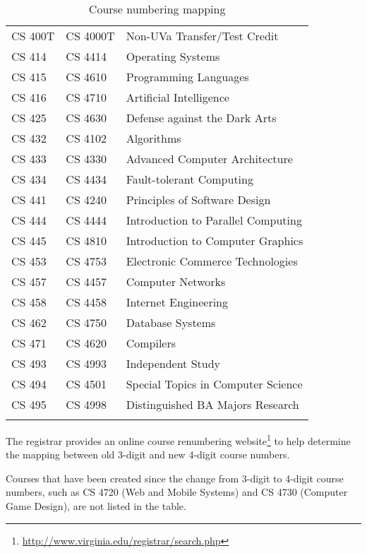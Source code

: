\documentclass[10pt,letter]{book}
\newcommand{\myurl}[1]{\footnote{\scriptsize\url{#1}}}
\begin{document}
\begin{table}
\begin{tabular}{llp{2.5in}}
CS 400T & CS 4000T & Non-UVa Transfer/Test Credit \\
CS 414 & CS 4414 & Operating Systems \\
CS 415 & CS 4610 & Programming Languages \\
CS 416 & CS 4710 & Artificial Intelligence \\
CS 425 & CS 4630 & Defense against the Dark Arts \\
CS 432 & CS 4102 & Algorithms \\
CS 433 & CS 4330 & Advanced Computer Architecture \\
CS 434 & CS 4434 & Fault-tolerant Computing \\
CS 441 & CS 4240 & Principles of Software Design \\
CS 444 & CS 4444 & Introduction to Parallel Computing \\
CS 445 & CS 4810 & Introduction to Computer Graphics \\
CS 453 & CS 4753 & Electronic Commerce Technologies \\
CS 457 & CS 4457 & Computer Networks \\
CS 458 & CS 4458 & Internet Engineering \\
CS 462 & CS 4750 & Database Systems \\
CS 471 & CS 4620 & Compilers \\
CS 493 & CS 4993 & Independent Study \\
CS 494 & CS 4501 & Special Topics in Computer Science \\
CS 495 & CS 4998 & Distinguished BA Majors Research \\ \hline
\\
\end{tabular}
\caption{Course numbering mapping}
\end{table}

The registrar provides an online course renumbering
website\myurl{http://www.virginia.edu/registrar/search.php}
to help determine the mapping between old 3-digit and new 4-digit
course numbers.

Courses that have been created since the change from 3-digit to
4-digit course numbers, such as CS 4720 (Web and Mobile Systems) and
CS 4730 (Computer Game Design), are not listed in the table.
\end{document}
